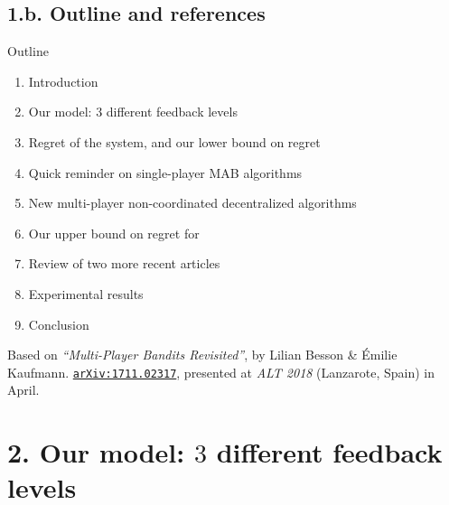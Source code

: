 \documentclass[12pt,english,ignorenonframetext,]{beamer}
\providecommand{\tightlist}{%
  \setlength{\itemsep}{0pt}\setlength{\parskip}{0pt}}
\begin{document}
\subsection{\hfill{}1.b. Outline and references\hfill{}}

\begin{frame}{Outline }

\vspace*{-15pt}

\begin{enumerate}
\def\labelenumi{\arabic{enumi}.}
\tightlist
\item
  Introduction
\item
  Our model: \(3\) different feedback levels
\item
  Regret of the system, and our lower bound on regret
  \vspace*{10pt}
  \pause
  \item
  Quick reminder on single-player MAB algorithms
  \item
  New multi-player non-coordinated decentralized algorithms
  \item
  Our upper bound on regret for \MCTopM
  \vspace*{10pt}
  \pause
  \item
  Review of two more recent articles
  \item
  Experimental results
  \vspace*{10pt}
  \pause
  \item
  Conclusion
\end{enumerate}

\pause

\vfill{}

\begin{footnotesize}
Based on
\emph{``Multi-Player Bandits Revisited''}, by Lilian Besson \& {\'E}milie Kaufmann.
\texttt{\textcolor{blue}{\href{https://arXiv.org/abs/1711.02317}{arXiv:1711.02317}}}, presented at \emph{ALT 2018} (Lanzarote, Spain) in April.
\end{footnotesize}

\end{frame}



\section{\hfill{}2. Our model: $3$ different feedback levels\hfill{}}
\end{document}
